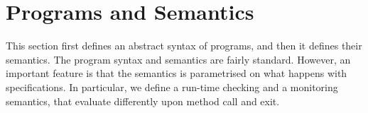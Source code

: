 \section{Programs and Semantics}\label{SecProgram}

This section first defines an abstract syntax of programs, and then it
defines their semantics. The program syntax and semantics are fairly
standard. However, an important feature is that the semantics is
parametrised on what happens with specifications. In particular, we
define a run-time checking and a monitoring semantics, that evaluate
differently upon method call and exit.


